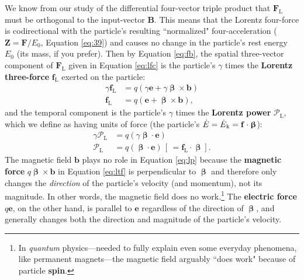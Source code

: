 \documentclass[12pt]{article}
\renewcommand{\vv}[1]{\mathbf{#1}}
\newcommand{\vvbeta}{\bm{\upbeta}}
\begin{document}
We know from our study of the differential four-vector triple product that $\vv F_{\mathrm{L}}$ must be orthogonal to the input-vector $\vv B$. This means that the Lorentz four-force is codirectional with the particle's resulting ``normalized" four-acceleration ($\vv Z =  \vv F / E_0$, Equation \ref{eq:39}) and causes no change in the particle's rest energy $E_0$ (its mass, if you prefer). Then by Equation \ref{eq:fb}, the spatial three-vector component of $\vv F_{\textrm{L}}$ given in Equation \ref{eq:lfc} is the particle's $\gamma$ times the \textbf{Lorentz three-force} $\vv f_{\textrm{L}}$ exerted on the particle:
\begin{equation}\label{eq:ltf}
\begin{split}
\gamma \vv f_{\textrm{L}} &= q ( \gamma \vv e + \gamma \vvbeta \times \vv b ) \\
\vv f_{\textrm{L}} &= q ( \vv e + \vvbeta \times \vv b ),
\end{split}
\end{equation}
and the temporal component is the particle's $\gamma$ times the \textbf{Lorentz power} $\mathcal{P}_{\textrm{L}}$, which we define as having units of force (the particle's $\dot{E} = \dot{E}_{\mkern.5mu \textrm{k}} = \vv f \cdot \vvbeta$):
\begin{equation}\label{eq:lp}
\begin{split}
\gamma \mathcal{P}_{\textrm{L}} &= q ( \gamma \vvbeta \cdot \vv e ) \\
\mathcal{P}_{\textrm{L}} &= q ( \vvbeta \cdot \vv e ) \, \left[ \, = \vv f_{\textrm{L}} \cdot \vvbeta \right].
\end{split}
\end{equation}
The magnetic field $\vv b$ plays no role in Equation \ref{eq:lp} because the \textbf{magnetic force} $q \vvbeta \times \vv b$ in Equation \ref{eq:ltf} is perpendicular to $\vvbeta$ and therefore only changes the \emph{direction} of the particle's velocity (and momentum), not its magnitude. In other words, the magnetic field does no work.\footnote{In \emph{quantum} physics---needed to fully explain even some everyday phenomena, like permanent magnets---the magnetic field arguably ``does work" because of particle \textbf{spin}.} The \textbf{electric force} $q \vv e$, on the other hand, is parallel to $\vv e$ regardless of the direction of $\vvbeta$, and generally changes both the direction and magnitude of the particle's velocity.
\end{document}

